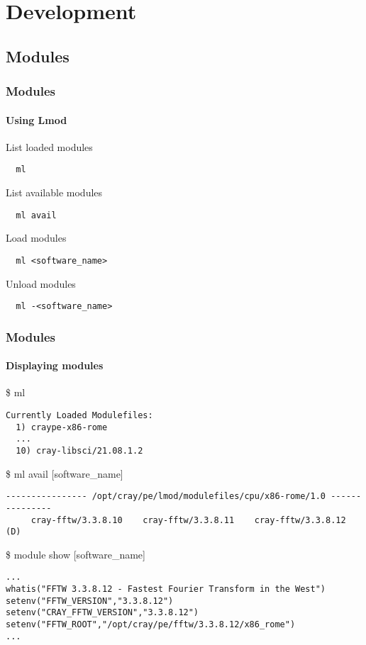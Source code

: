 \section{Development}

\subsection{Modules}
\begin{frame}[fragile]
\frametitle{Modules}
\framesubtitle{Using Lmod}

\begin{exampleblock}{List loaded modules}
  \begin{verbatim}
  ml
  \end{verbatim}
\end{exampleblock}

\begin{exampleblock}{List available modules}
  \begin{verbatim}
  ml avail
  \end{verbatim}
\end{exampleblock}

\begin{exampleblock}{Load modules}
  \begin{verbatim}
  ml <software_name>
  \end{verbatim}
\end{exampleblock}

\begin{exampleblock}{Unload modules}
  \begin{verbatim}
  ml -<software_name>
  \end{verbatim}
\end{exampleblock}
\end{frame}


\begin{frame}[fragile]
\frametitle{Modules}
\framesubtitle{Displaying modules}
\begin{exampleblock}{\$ ml}
\scriptsize
\begin{verbatim}
Currently Loaded Modulefiles:
  1) craype-x86-rome
  ...
  10) cray-libsci/21.08.1.2
\end{verbatim}
\end{exampleblock}

\begin{exampleblock}{\$ ml avail [software\_name]}
\scriptsize
\begin{verbatim}
---------------- /opt/cray/pe/lmod/modulefiles/cpu/x86-rome/1.0 ---------------
     cray-fftw/3.3.8.10    cray-fftw/3.3.8.11    cray-fftw/3.3.8.12 (D)
\end{verbatim}
\end{exampleblock}

\begin{exampleblock}{\$ module show [software\_name]}
\scriptsize
\begin{verbatim}
...
whatis("FFTW 3.3.8.12 - Fastest Fourier Transform in the West")
setenv("FFTW_VERSION","3.3.8.12")
setenv("CRAY_FFTW_VERSION","3.3.8.12")
setenv("FFTW_ROOT","/opt/cray/pe/fftw/3.3.8.12/x86_rome")
...
\end{verbatim}
\end{exampleblock}
\end{frame}


